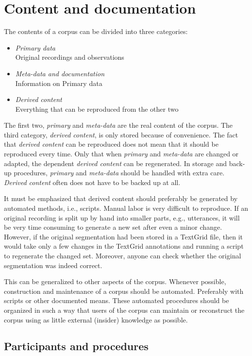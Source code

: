 \documentclass[10pt, a4paper]{article}
\begin{document}
\section{Content and documentation}

The contents of a corpus can be divided into three categories:
\begin{itemize}
\item \emph{Primary data}\\Original recordings and observations
\item \emph{Meta-data and documentation}\\Information on Primary data
\item \emph{Derived content}\\Everything that can be reproduced from the other two
\end{itemize}
The first two, \emph{primary} and \emph{meta-data} are the real content of the corpus. The third category, \emph{derived content}, is only stored because of convenience. The fact that \emph{derived content} can be reproduced does not mean that it should be reproduced every time. Only that when \emph{primary} and \emph{meta-data} are changed or adapted, the dependent \emph{derived content} can be regenerated. In storage and back-up procedures, \emph{primary} and \emph{meta-data} should be handled with extra care. \emph{Derived content} often does not have to be backed up at all.

It must be emphasized that derived content should preferably be generated by automated methods, i.e., scripts. Manual labor is very difficult to reproduce. If an original recording is split up by hand into smaller parts, e.g., utterances, it will be very time consuming to generate a new set after even a minor change. However, if the original segmentation had been stored in a TextGrid file, then it would take only a few changes in the TextGrid annotations and running a script to regenerate the changed set. Moreover, anyone can check whether the original segmentation was indeed correct.

This can be generalized to other aspects of the corpus. Whenever possible, construction and maintenance of a corpus should be automated. Preferably with scripts or other documented means. These automated procedures should be organized in such a way that users of the corpus can maintain or reconstruct the corpus using as little external (insider) knowledge as possible.

\subsection{Participants and procedures}
\end{document}
